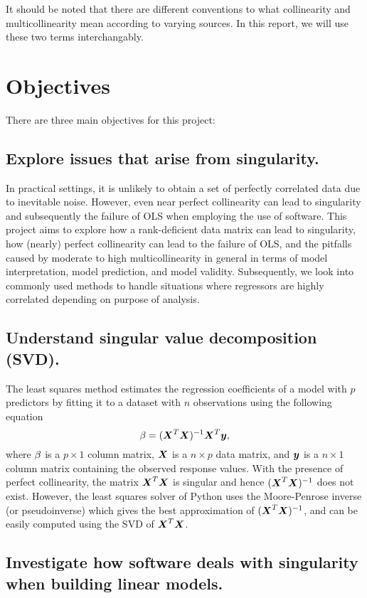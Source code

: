 \documentclass[12pt]{article}
\begin{document}
	It should be noted that there are different conventions to what collinearity and multicollinearity mean according to varying sources. In this report, we will use these two terms interchangably.
	
	\pagebreak
	
	\section{Objectives}
	
	There are three main objectives for this project:
	\subsection{Explore issues that arise from singularity.}
	
	In practical settings, it is unlikely to obtain a set of perfectly correlated data due to inevitable noise. However, even near perfect collinearity can lead to singularity and subsequently the failure of OLS when employing the use of software. This project aims to explore how a rank-deficient data matrix can lead to singularity, how (nearly) perfect collinearity can lead to the failure of OLS, and the pitfalls caused by moderate to high multicollinearity in general in terms of model interpretation, model prediction, and model validity. Subsequently, we look into commonly used methods to handle situations where regressors are highly correlated depending on purpose of analysis.
	
	\subsection{Understand singular value decomposition (SVD).}
	
	The least squares method estimates the regression coefficients of a model with $p$ predictors by fitting it to a dataset with $n$ observations using the following equation
	$$\mathbf{\beta}=(\boldsymbol{X}^T\boldsymbol{X})^{-1}\boldsymbol{X}^T\boldsymbol{y},$$
	where $\mathbf{\beta}$ is a $p\times 1$ column matrix, $\boldsymbol{X}$ is a $n\times p$ data matrix, and $\boldsymbol{y}$ is a $n\times 1$ column matrix containing the observed response values. With the presence of perfect collinearity, the matrix $\boldsymbol{X}^T\boldsymbol{X}$ is singular and hence $(\boldsymbol{X}^T\boldsymbol{X})^{-1}$ does not exist. However, the least squares solver of Python uses the Moore-Penrose inverse (or pseudoinverse) which gives the best approximation of $(\boldsymbol{X}^T\boldsymbol{X})^{-1}$, and can be easily computed using the SVD of $\boldsymbol{X}^T\boldsymbol{X}$.
	
	
	\subsection{Investigate how software deals with singularity when building linear models.}
	
\end{document}
